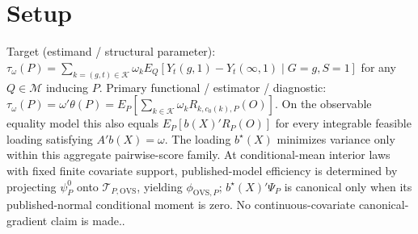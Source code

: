 \documentclass{article}
\begin{document}
\section{Setup}

Target (estimand / structural parameter): \(\tau_{\omega}(P)=\sum_{k=(g,t)\in\mathcal K}\omega_k E_Q[Y_t(g,1)-Y_t(\infty,1)\mid G=g,S=1]\) for any \(Q\in\mathcal M\) inducing \(P\).
Primary functional / estimator / diagnostic: \(\tau_{\omega}(P)=\omega'\theta(P)=E_P[\sum_{k\in\mathcal K}\omega_kR_{k,c_0(k),P}(O)]\).  On the observable equality model this also equals \(E_P[b(X)'R_P(O)]\) for every integrable feasible loading satisfying \(A'b(X)=\omega\).  The loading \(b^\star(X)\) minimizes variance only within this aggregate pairwise-score family.  At conditional-mean interior laws with fixed finite covariate support, published-model efficiency is determined by projecting \(\psi_P^0\) onto \(\mathcal T_{P,\mathrm{OVS}}\), yielding \(\phi_{\mathrm{OVS},P}\); \(b^\star(X)'\Psi_P\) is canonical only when its published-normal conditional moment is zero.  No continuous-covariate canonical-gradient claim is made..
\end{document}
